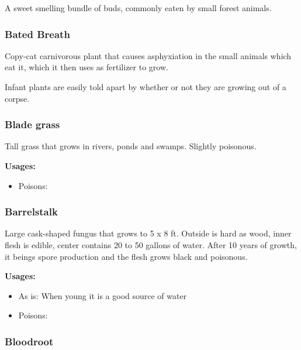 A sweet smelling bundle of buds, commonly eaten by small forest animals.

\subsubsection{Bated Breath}
\label{bated_breath}

Copy-cat carnivorous plant that causes asphyxiation in the small animals which eat it, which it then uses as fertilizer to grow.

Infant plants are easily told apart by whether or not they are growing out of a corpse.

\subsubsection{Blade grass}
\label{Blade grass}

Tall grass that grows in rivers, ponds and swamps. Slightly poisonous.

\vspace{5mm}

\textbf{Usages:}

\begin{itemize}[noitemsep]
\item[] Poisons: \poison
\end{itemize}

\subsubsection{Barrelstalk}
\label{Barrelstalk}

Large cask-shaped fungus that grows to 5 x 8 ft. Outside is hard as wood, inner flesh is edible, center contains 20 to 50 gallons of water. After 10 years of growth, it beings spore production and the flesh grows black and poisonous.

\vspace{5mm}

\textbf{Usages:}

\begin{itemize}[noitemsep]
\item[] As is: When young it is a good source of water
\item[] Poisons: \poison
\end{itemize}

\subsubsection{Bloodroot}
\label{bloodroot}


